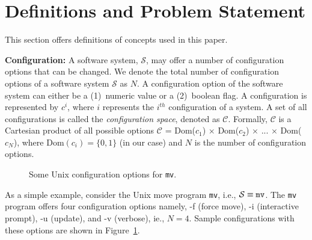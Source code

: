 \documentclass[10pt,journal,compsoc]{IEEEtran}
\newcommand{\fig}[1]{Figure~\ref{fig:#1}}
\begin{document}
\section{Definitions and Problem Statement}
\label{sect:formalization}
\noindent This  section offers definitions of concepts
 used in this paper. 
 
\noindent\textbf{Configuration: }A software system, $\mathcal{S}$, may offer a number of configuration options that can be changed. We denote the total number of configuration options of a software system $\mathcal{S}$  as $N$. A configuration option of the software system can either be a (1)~numeric value or a (2)~boolean flag. A configuration is represented by $c^{i}$, where $i$ represents the $i^{th}$ configuration of a system. A set of all configurations is called the \textit{configuration space}, denoted as $\mathcal{C}$.
  Formally, $\mathcal{C}$ is a Cartesian product of all possible options $\mathcal{C}$ = Dom($c_1$) $\times$ Dom($c_2$) $\times$ ... $\times$ Dom($c_N$), where $\text{Dom}(c_i) = \{0, 1\}$ (in our case) and $N$ is the number of configuration options. 

\begin{figure}
    \scriptsize \centering
    \caption{Some Unix  configuration options for  \texttt{mv}.}
    \label{fig:sample_config}
\end{figure}
As a simple example, consider the Unix move program \texttt{mv}, i.e., $\mathcal{S}\equiv\text{\texttt{mv}}$. The \texttt{mv} program offers four configuration options namely, -f (force move), -i    (interactive prompt), -u (update), and -v (verbose), ie., $N=4$. Sample configurations with these options are shown in \fig{sample_config}. %
\end{document}
